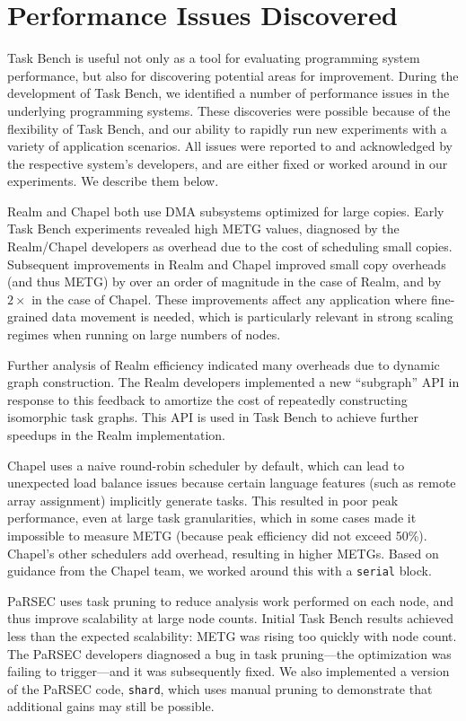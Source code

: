 \section{Performance Issues Discovered}
\label{sec:case-study}

Task Bench is useful not only as a tool for evaluating programming
system performance, but also for discovering potential areas for
improvement. During the development of Task Bench, we identified a
number of performance issues in the underlying programming
systems. These discoveries were possible because of the flexibility of
Task Bench, and our ability to rapidly run new experiments with a
variety of application scenarios. All issues were reported to and
acknowledged by the respective system's developers, and are either
fixed or worked around in our experiments. We describe them below.

Realm and Chapel both use DMA subsystems optimized for large
copies. Early Task Bench experiments revealed high METG values,
diagnosed by the Realm/Chapel developers as overhead due to the
cost of scheduling small copies. Subsequent improvements in Realm and
Chapel improved small copy overheads (and thus METG) by over an order
of magnitude in the case of Realm, and by $2\times$ in the case of
Chapel. These improvements affect any application where fine-grained
data movement is needed, which is particularly relevant in strong scaling
regimes when running on large numbers of nodes.

Further analysis of Realm efficiency indicated many overheads due to
dynamic graph construction. The Realm developers implemented a new
``subgraph'' API in response to this feedback to amortize the cost of
repeatedly constructing isomorphic task graphs. This API is used in
Task Bench to achieve further speedups in the Realm implementation.

Chapel uses a naive round-robin scheduler by default, which can lead
to unexpected load balance issues because certain language features
(such as remote array assignment) implicitly generate tasks. This
resulted in poor peak performance, even at large task granularities,
which in some cases made it impossible to measure METG (because peak
efficiency did not exceed 50\%). Chapel's other schedulers add
overhead, resulting in higher METGs. Based on guidance from the Chapel team, we worked around this with
a \lstinline{serial} block.

PaRSEC uses task pruning to reduce analysis work performed on each
node, and thus improve scalability at large node
counts. Initial Task Bench results achieved less than the expected
scalability: METG was rising too quickly with node count.  The PaRSEC
developers diagnosed a bug in task pruning---the optimization was failing to trigger---and it was
subsequently fixed. We also implemented a version of the PaRSEC code,
\lstinline{shard}, which uses manual pruning to demonstrate that
additional gains may still be possible.

